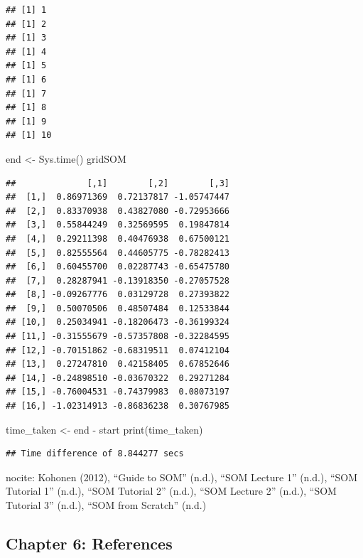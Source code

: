 \documentclass[
]{article}
\newenvironment{Shaded}{\begin{snugshade}}{\end{snugshade}}
\newcommand{\FunctionTok}[1]{\textcolor[rgb]{0.00,0.00,0.00}{#1}}
\newcommand{\NormalTok}[1]{#1}
\newcommand{\OtherTok}[1]{\textcolor[rgb]{0.56,0.35,0.01}{#1}}
\newcommand{\SpecialCharTok}[1]{\textcolor[rgb]{0.00,0.00,0.00}{#1}}
\begin{document}
\begin{verbatim}
## [1] 1
## [1] 2
## [1] 3
## [1] 4
## [1] 5
## [1] 6
## [1] 7
## [1] 8
## [1] 9
## [1] 10
\end{verbatim}

\begin{Shaded}
\begin{Highlighting}[]
\NormalTok{end }\OtherTok{\textless{}{-}} \FunctionTok{Sys.time}\NormalTok{()}
\NormalTok{gridSOM}
\end{Highlighting}
\end{Shaded}

\begin{verbatim}
##              [,1]        [,2]        [,3]
##  [1,]  0.86971369  0.72137817 -1.05747447
##  [2,]  0.83370938  0.43827080 -0.72953666
##  [3,]  0.55844249  0.32569595  0.19847814
##  [4,]  0.29211398  0.40476938  0.67500121
##  [5,]  0.82555564  0.44605775 -0.78282413
##  [6,]  0.60455700  0.02287743 -0.65475780
##  [7,]  0.28287941 -0.13918350 -0.27057528
##  [8,] -0.09267776  0.03129728  0.27393822
##  [9,]  0.50070506  0.48507484  0.12533844
## [10,]  0.25034941 -0.18206473 -0.36199324
## [11,] -0.31555679 -0.57357808 -0.32284595
## [12,] -0.70151862 -0.68319511  0.07412104
## [13,]  0.27247810  0.42158405  0.67852646
## [14,] -0.24898510 -0.03670322  0.29271284
## [15,] -0.76004531 -0.74379983  0.08073197
## [16,] -1.02314913 -0.86836238  0.30767985
\end{verbatim}

\begin{Shaded}
\begin{Highlighting}[]
\NormalTok{time\_taken }\OtherTok{\textless{}{-}}\NormalTok{ end }\SpecialCharTok{{-}}\NormalTok{ start}
\FunctionTok{print}\NormalTok{(time\_taken)}
\end{Highlighting}
\end{Shaded}

\begin{verbatim}
## Time difference of 8.844277 secs
\end{verbatim}

nocite: \textbar{} Kohonen (2012), {``Guide to SOM''} (n.d.), {``SOM
Lecture 1''} (n.d.), {``SOM Tutorial 1''} (n.d.), {``SOM Tutorial 2''}
(n.d.), {``SOM Lecture 2''} (n.d.), {``SOM Tutorial 3''} (n.d.), {``SOM
from Scratch''} (n.d.)

\hypertarget{chapter-6-references}{%
\subsection*{Chapter 6: References}\label{chapter-6-references}}
\end{document}

